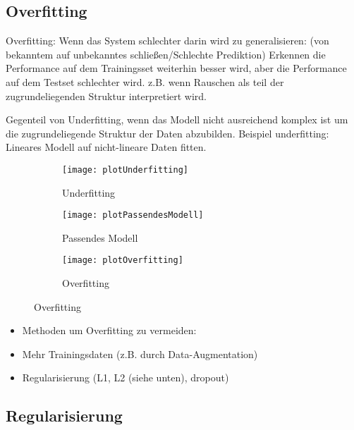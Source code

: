 \subsection{Overfitting}

Overfitting:
	Wenn das System schlechter darin wird zu generalisieren: (von bekanntem auf unbekanntes schließen/Schlechte Prediktion)
	Erkennen die Performance auf dem Trainingsset weiterhin besser wird, aber die Performance auf dem Testset schlechter wird.
	z.B. wenn Rauschen als teil der zugrundeliegenden Struktur interpretiert wird.

Gegenteil von Underfitting, wenn das Modell nicht ausreichend komplex ist um die zugrundeliegende Struktur der Daten abzubilden. 
Beispiel underfitting: Lineares Modell auf nicht-lineare Daten fitten.


\begin{figure}[h]
    \centering
    \begin{subfigure}[t]{0.4\textwidth}
		\texttt{[image: plotUnderfitting]}
		\caption{Underfitting}
    \end{subfigure}
    \begin{subfigure}[t]{0.4\textwidth}
		\texttt{[image: plotPassendesModell]}
		\caption{Passendes Modell}
	\end{subfigure}
	\quad
    \begin{subfigure}[t]{0.8\textwidth}
        \texttt{[image: plotOverfitting]}
        \caption{Overfitting}
    \end{subfigure}
    \label{fig:overfitting}
\end{figure}

\begin{itemize}
	\item Methoden um Overfitting zu vermeiden:
	\item Mehr Trainingsdaten (z.B. durch Data-Augmentation)
	\item Regularisierung (L1, L2 (siehe unten), dropout)
\end{itemize}


\subsection{Regularisierung}

